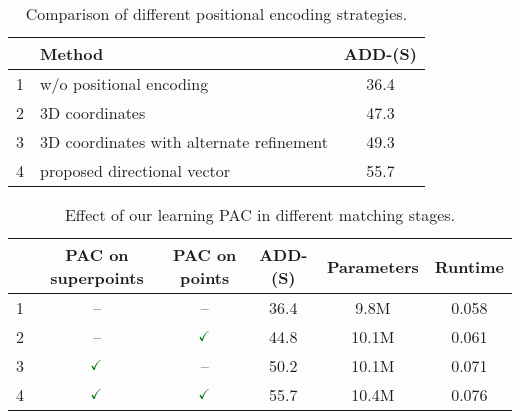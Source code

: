 \begin{table}[t]
    \centering
    \setlength{\tabcolsep}{3.5pt}
    \caption{Comparison of different positional encoding strategies.}
    \begin{adjustbox}{max width=\textwidth}
        \begin{tabular}{rlc}
            \toprule
            & Method & ADD-(S) \\ 
            \midrule
            {\color{teal}\scriptsize 1} & w/o positional encoding & 36.4 \\ 
            {\color{teal}\scriptsize 2} & 3D coordinates &  47.3 \\ 
            {\color{teal}\scriptsize 3} & 3D coordinates with alternate refinement  & 49.3 \\ 
            {\color{teal}\scriptsize 4} & proposed directional vector & 55.7  \\ 
            \bottomrule
        \end{tabular}
    \end{adjustbox}
    \label{tab:aba1_pe_methods}
    \vspace{-2mm}
\end{table}

\begin{table}[t]
    \centering
    \setlength{\tabcolsep}{3.5pt}
    \caption{Effect of our learning PAC in different matching stages.}
    \begin{adjustbox}{max width=\textwidth}
        \begin{tabular}{rccccc}
            \toprule
            & PAC on superpoints & PAC on points & ADD-(S) & Parameters & Runtime \\ 
            \midrule
            {\color{teal}\scriptsize 1} & -- & -- & 36.4 & 9.8M & 0.058\\ 
            {\color{teal}\scriptsize 2} & -- & $\greencheckmark$ & 44.8 & 10.1M & 0.061\\ 
            {\color{teal}\scriptsize 3} & $\greencheckmark$ & --  &  50.2 &  10.1M & 0.071\\ 
            {\color{teal}\scriptsize 4} & $\greencheckmark$ & $\greencheckmark$ & 55.7 & 10.4M & 0.076  \\ 
            \bottomrule
        \end{tabular}
    \end{adjustbox}
    \label{tab:aba_scale}
    \vspace{-2mm}
\end{table}